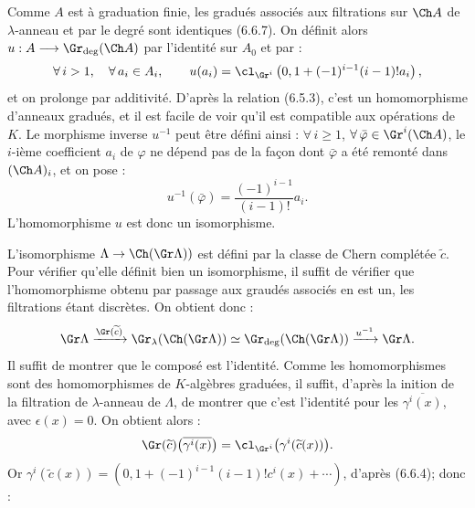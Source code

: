 Comme \(A\) est à graduation finie, les gradués associés aux filtrations sur \(\Ch A\) de \(\lambda\)-anneau et par le degré sont identiques (6.6.7). On définit alors \(u:A\longrightarrow \Gr_{\deg}(\Ch A)\) par l'identité sur \(A_0\) et par :
\[
  \forall\, i>1,\quad\forall\, a_i\in A_i,\qquad u(a_i)=\cl_{\Gr^i}\left(0,1+(-1)^{i-1}(i-1)!a_i\right),
\]
et on prolonge par additivité. D'après la relation (6.5.3), c'est un homomorphisme d'anneaux gradués, et il est facile de voir qu'il est compatible aux opérations de \(K\). Le morphisme inverse \(u^{-1}\) peut être défini ainsi : \(\forall\, i\ge1\), \(\forall\,\bar\varphi\in\Gr^i(\Ch A)\), le \(i\)-ième coefficient \(a_i\) de \(\varphi\) ne dépend pas de la façon dont \(\bar\varphi\) a été remonté dans \((\Ch A)_i\), et on pose :
\[
  u^{-1}(\bar\varphi)=\frac{(-1)^{i-1}}{(i-1)!}a_i.
\]
L'homomorphisme \(u\) est donc un isomorphisme.

L'isomorphisme \(\Lambda\to\Ch(\Gr\Lambda))\) est défini par la classe de Chern complétée \(\widetilde c\). Pour vérifier qu'elle définit bien un isomorphisme, il suffit de vérifier que l'homomorphisme obtenu par passage aux graudés associés en est un, les filtrations étant discrètes. On obtient donc :
\[
  \Gr\Lambda
   \xrightarrow{\Gr(\widetilde c)}
  \Gr_{\lambda}(\Ch(\Gr\Lambda))
   \simeq
  \Gr_{\deg}(\Ch(\Gr\Lambda))
   \xrightarrow{u^{-1}}
  \Gr\Lambda .
\]
Il suffit de montrer que le composé est l'identité. Comme les homomorphismes sont des homomorphismes de \(K\)-algèbres graduées, il suffit, d'après la \hphantom{déf}inition de la filtration de \(\lambda\)-anneau de \(\Lambda\), de montrer que c'est l'identité pour les \(\overline{\gamma^i(x)}\), avec \(\epsilon(x)=0\). On obtient alors :
\[
  \Gr(\widetilde c)\bigl(\overline{\gamma^i(x)}\bigr)
  =
  \cl_{\Gr^i}\bigl(\gamma^i(\widetilde c(x))\bigr).
\]
Or \(\gamma^i(\widetilde c(x))=(0,1+(-1)^{i-1}(i-1)!c^i(x)+\cdots)\), d'après (6.6.4); donc :
